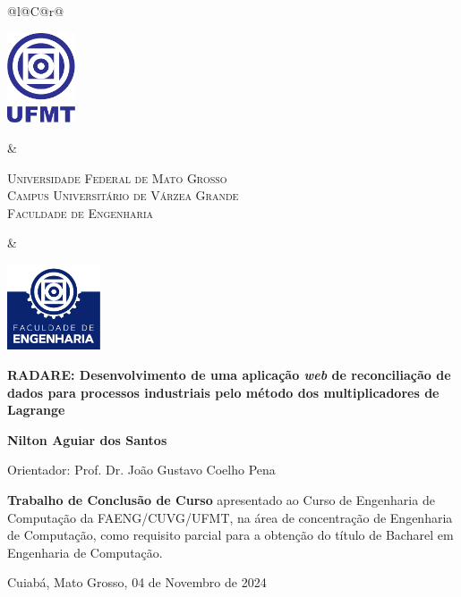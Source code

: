 \begin{titlepage}

\begin{center}

\small

\begin{tabularx}{\linewidth}{@{}l@{}C@{}r@{}}
\parbox[c]{2cm}{\includegraphics[width=2cm]{pre-textuais/figuras/ufmt}} &
\begin{center}
\textsf{\textsc{Universidade Federal de Mato Grosso\\
Campus Universitário de Várzea Grande\\
Faculdade de Engenharia}}
\end{center} &
\parbox[c]{2cm}{\includegraphics[width=2.75cm]{pre-textuais/figuras/faeng}}
\end{tabularx}

\vfill

\LARGE

\textbf{RADARE: Desenvolvimento de uma aplicação \textit{web} de reconciliação de dados para processos industriais pelo método dos multiplicadores de Lagrange}

\vfill

\Large

\textbf{Nilton Aguiar dos Santos}

\vfill

\normalsize

Orientador: Prof. Dr. João Gustavo Coelho Pena

\vfill

\hfill
\parbox{0.5\linewidth}{\textbf{Trabalho de Conclusão de Curso}
apresentado ao Curso de Engenharia de Computação da FAENG/CUVG/UFMT,
na área de concentração de Engenharia de Computação,
como requisito parcial para a obtenção do título de Bacharel
em Engenharia de Computação.}

\vfill

\large

Cuiabá, Mato Grosso, 04 de Novembro de 2024

\end{center}

\end{titlepage}

